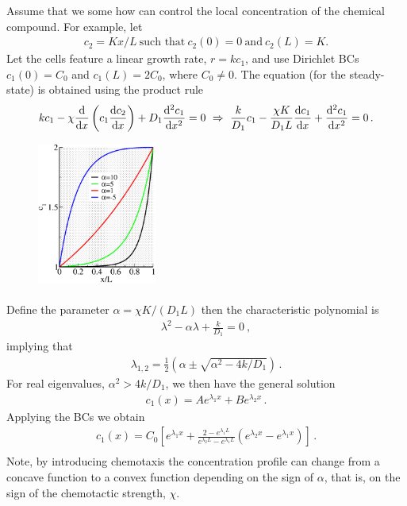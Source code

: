 \begin{example}
	\label{ex:chemotaxis}
	Assume that we some how  can control the local concentration of the chemical compound.
	For example, let
	\begin{eqnarray}
		\label{eq:c2}
		c_2 = Kx/L  \ \text{such that} \ c_2(0)=0 \ \text{and} \ c_2(L) = K.
	\end{eqnarray}
	Let the cells feature a linear growth rate, $r = k c_1$, and use Dirichlet
	BCs $c_1(0) = C_0$ and $c_1(L) = 2C_0$, where $C_0 \neq 0$.  
	The equation (for the steady-state) is 	obtained using the product rule
	\begin{eqnarray}
		k c_1 -\chi \frac{\d}{\d x} \left( c_1 \frac{\d c_2}{\d x}\right) + D_1 \frac{\d ^2 c_1}{\d x^2} = 
		0 \ \Rightarrow \ 
		\frac{k}{D_1} c_1 - \frac{\chi K}{D_1 L} \frac{\d c_1}{\d x} +
		\frac{\d^2c_1}{\d x^2} =  0 \, . 
	\end{eqnarray}
	\begin{figure}
		\centering
		\includegraphics[width=0.35\textwidth]{figs/chemotaxis.eps}
		\caption*{}
	\end{figure}
	\paragraph{}
	\vspace*{-\parskip}
	Define the parameter $\alpha = \chi K/(D_1 L)$ then the characteristic polynomial is 
	\begin{eqnarray}
		\lambda^2 - \alpha \lambda + \frac{k}{D_1} = 0 \ ,
	\end{eqnarray}
	implying that 
	\begin{eqnarray}
		\lambda_{1,2} = \frac{1}{2}\left(
		\alpha \pm \sqrt{\alpha^2 - 4k/D_1}  \right) \, .
	\end{eqnarray}
	For real eigenvalues, $\alpha^2 > 4k/D_1$, we then have the general solution
	\begin{eqnarray}
		c_1(x) = A e^{\lambda_1 x} + B e^{\lambda_2 x} \, .
	\end{eqnarray}
	Applying the BCs we obtain
	\begin{eqnarray}
		c_1(x) = C_0 \left[
			e^{\lambda_1x} + \frac{2 - e^{\lambda_1 L}}{e^{\lambda_2L}-e^{\lambda_1 L}} 
			(e^{\lambda_2 x} - e^{\lambda_1 x})
		\right] \, . \nonumber \\
	\end{eqnarray}
	Note, by introducing chemotaxis the concentration profile can change from a
	concave function to a convex function depending on the sign of $\alpha$,
	that is, on the sign of the chemotactic strength, $\chi$.
\end{example}


